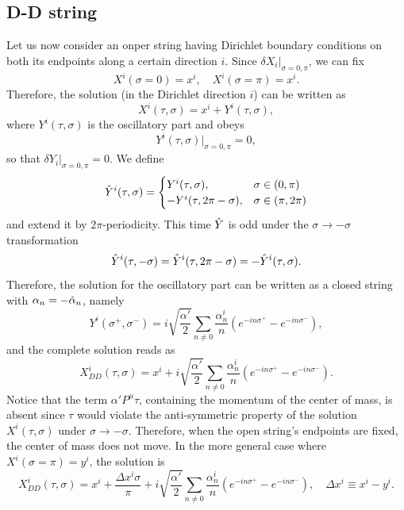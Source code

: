 \subsection{D-D string}
Let us now consider an onper string having Dirichlet boundary conditions on both its endpoints along a certain direction $i$. Since $\delta X_i|_{\sigma = 0,\pi}$, we can fix 
\begin{equation}
    X^i(\sigma = 0) = x^i,\quad X^i(\sigma = \pi) = x^i.
\end{equation}
Therefore, the solution (in the Dirichlet direction $i$) can be written as 
\begin{equation}
    X^i(\tau,\sigma) = x^i + Y^i(\tau,\sigma),
\end{equation}
where $Y^i(\tau,\sigma)$ is the oscillatory part and obeys 
\begin{equation}
    Y^i(\tau,\sigma)|_{\sigma = 0,\pi} = 0,
\end{equation}
so that $\delta Y_i|_{\sigma = 0,\pi} = 0$. We define 
\begin{equation}
    \hat{Y}^i(\tau,\sigma) = 
    \begin{cases}
        Y^i(\tau,\sigma), &\sigma \in (0,\pi) \\
        -Y^i(\tau,2\pi - \sigma), &\sigma \in (\pi,2\pi)
    \end{cases}
\end{equation}
and extend it by $2\pi$-periodicity. This time $\hat{Y}$ is odd under the $\sigma \to -\sigma$ transformation
\begin{equation}
    \hat{Y}^i(\tau,-\sigma) = \hat{Y}^i(\tau,2\pi - \sigma) = -\hat{Y}^i(\tau,\sigma). 
\end{equation}
Therefore, the solution for the oscillatory part can be written as a closed string with $\alpha_n = -\tilde{\alpha}_n$, namely
\begin{equation}
    Y^i(\sigma^+,\sigma^-) = i\sqrt{\frac{\alpha'}{2}}\sum_{n \neq 0}\frac{\alpha_n^i}{n}(e^{-in\sigma^+} - e^{-in\sigma^-}),    
\end{equation}
and the complete solution reads as 
\begin{equation}
    X_{DD}^i(\tau,\sigma) = x^i + i\sqrt{\frac{\alpha'}{2}}\sum_{n \neq 0}\frac{\alpha_n^i}{n}(e^{-in\sigma^+} - e^{-in\sigma^-}).
\end{equation}
Notice that the term $\alpha'P^\mu\tau$, containing the momentum of the center of mass, is absent since $\tau$ would violate the anti-symmetric property of the solution $X^i(\tau,\sigma)$ under $\sigma \to -\sigma$. Therefore, when the open string's endpoints are fixed, the center of mass does not move. In the more general case where $X^i(\sigma = \pi) = y^i$, the solution is 
\begin{equation}
    X_{DD}^i(\tau,\sigma) = x^i + \frac{\Delta x^i\sigma}{\pi} + i\sqrt{\frac{\alpha'}{2}}\sum_{n \neq 0}\frac{\alpha_n^i}{n}(e^{-in\sigma^+} - e^{-in\sigma^-}),\quad \Delta x^i \equiv x^i - y^i.
\end{equation}

